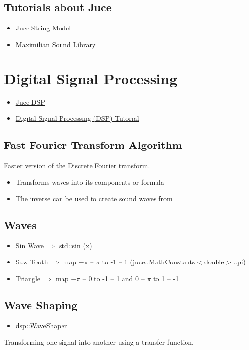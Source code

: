 \documentclass{article}
\begin{document}
	 
	 \subsection{Tutorials about Juce}
	 \begin{itemize}
	 	\item \href{https://docs.juce.com/master/tutorial_dsp_delay_line.html}{Juce String Model}
	 	\item \href{https://github.com/micknoise/Maximilian}{Maximilian Sound Library}
	 \end{itemize}

\section{Digital Signal Processing}
	\begin{itemize}
		\item \href{https://docs.juce.com/master/tutorial_dsp_introduction.html}{Juce DSP}
		\item \href{https://www.youtube.com/watch?v=HJ_-5mqUZ70}{Digital Signal Processing (DSP) Tutorial}
	\end{itemize}
	
	\subsection{Fast Fourier Transform Algorithm}
	Faster version of the Discrete Fourier transform.
	\begin{itemize}
		\item Transforms waves into its components or formula
		\item The inverse can be used to create sound waves from 
	\end{itemize}
	
	\subsection{Waves}
	\begin{itemize}
		\item Sin Wave $\Rightarrow$ std::sin (x)
		\item Saw Tooth $\Rightarrow$ map $-\pi$ -- $\pi$ to -1 -- 1 (juce::MathConstants$<$double$>$::pi)
		\item Triangle $\Rightarrow$ map $-\pi$ -- 0 to -1 -- 1 and 0 -- $\pi$ to 1 -- -1
	\end{itemize}
	
	
	\subsection{Wave Shaping}
	\begin{itemize}
		\item \href{https://docs.juce.com/master/structdsp_1_1WaveShaper.html}{dsp::WaveShaper}
	\end{itemize}
	Transforming one signal into another using a transfer function.
\end{document}
